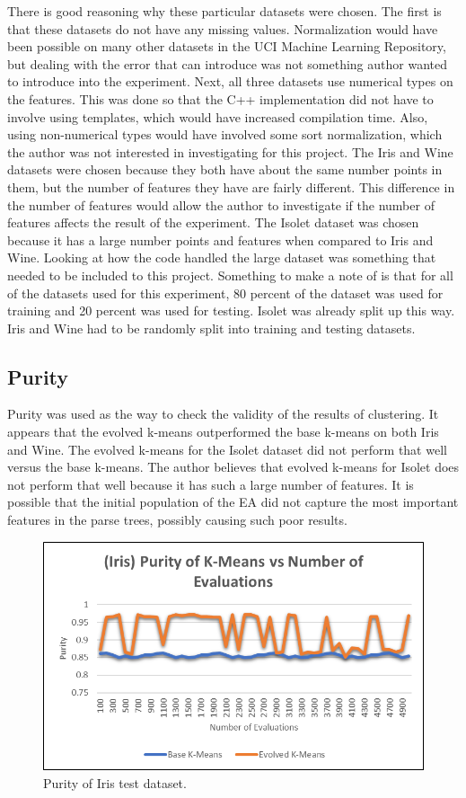 \documentclass[conference]{IEEEtran}
\begin{document}
There is good reasoning why these particular datasets were chosen.  The first is that these datasets do not have any missing values.  Normalization would have been possible on many other datasets in the UCI Machine Learning Repository, but dealing with the error that can introduce was not something author wanted to introduce into the experiment.  Next, all three datasets use numerical types on the features.  This was done so that the C++ implementation did not have to involve using templates, which would have increased compilation time.  Also, using non-numerical types would have involved some sort normalization, which the author was not interested in investigating for this project.  The Iris and Wine datasets were chosen because they both have about the same number points in them, but the number of features they have are fairly different.  This difference in the number of features would allow the author to investigate if the number of features affects the result of the experiment.  The Isolet dataset was chosen because it has a large number points and features when compared to Iris and Wine.  Looking at how the code handled the large dataset was something that needed to be included to this project.  Something to make a note of is that for all of the datasets used for this experiment, 80 percent of the dataset was used for training and 20 percent was used for testing.  Isolet was already split up this way.  Iris and Wine had to be randomly split into training and testing datasets.
\subsection{Purity}
Purity was used as the way to check the validity of the results of clustering.  It appears that the evolved k-means outperformed the base k-means on both Iris and Wine.  The evolved k-means for the Isolet dataset did not perform that well versus the base k-means.  The author believes that evolved k-means for Isolet does not perform that well because it has such a large number of features.  It is possible that the initial population of the EA did not capture the most important features in the parse trees, possibly causing such poor results.
\begin{figure}[H]
\begin{center}
\includegraphics[width=0.7\columnwidth]{irispurity.png}
\caption{Purity of Iris test dataset.}
\end{center}
\label{fig}
\end{figure}
\end{document}
